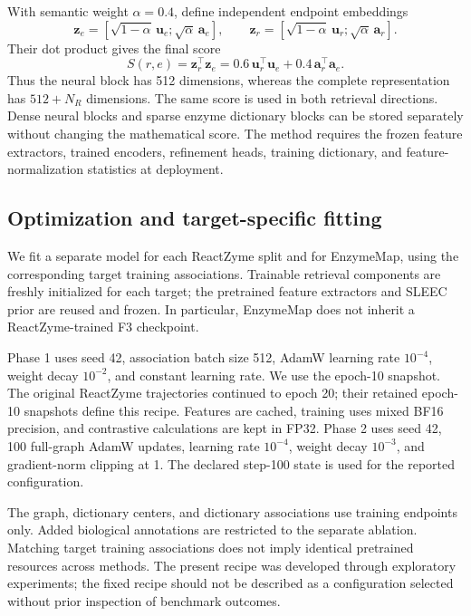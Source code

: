 With semantic weight $\alpha=0.4$, define independent endpoint embeddings
\begin{equation}
  \mathbf{z}_e=[\sqrt{1-\alpha}\,\mathbf{u}_e;\sqrt{\alpha}\,\mathbf{a}_e],\qquad
  \mathbf{z}_r=[\sqrt{1-\alpha}\,\mathbf{u}_r;\sqrt{\alpha}\,\mathbf{a}_r].
  \label{eq:v4-concatenation}
\end{equation}
Their dot product gives the final score
\begin{equation}
  \boxed{S(r,e)=\mathbf{z}_r^\top\mathbf{z}_e
       =0.6\,\mathbf{u}_r^\top \mathbf{u}_e+0.4\,\mathbf{a}_r^\top \mathbf{a}_e.}
  \label{eq:v4-final-score}
\end{equation}
Thus the neural block has 512 dimensions, whereas the complete representation
has $512+N_R$ dimensions. The same score is used in both retrieval directions.
Dense neural blocks and sparse enzyme dictionary blocks can be stored
separately without changing the mathematical score. The method requires the
frozen feature extractors, trained encoders, refinement heads, training
dictionary, and feature-normalization statistics at deployment.

\subsection{Optimization and target-specific fitting}
\label{sec:v4-optimization}
We fit a separate model for each ReactZyme split and for EnzymeMap, using the
corresponding target training associations. Trainable retrieval components
are freshly initialized for each target; the pretrained feature extractors
and SLEEC prior are reused and frozen. In particular, EnzymeMap does not
inherit a ReactZyme-trained F3 checkpoint.

Phase 1 uses seed 42, association batch size 512, AdamW learning rate
$10^{-4}$, weight decay $10^{-2}$, and constant learning rate. We use the
epoch-10 snapshot. The original ReactZyme trajectories continued to epoch 20;
their retained epoch-10 snapshots define this recipe. Features are cached,
training uses mixed BF16 precision, and contrastive calculations are kept in
FP32. Phase 2 uses seed 42, 100 full-graph AdamW updates, learning rate
$10^{-4}$, weight decay $10^{-3}$, and gradient-norm clipping at 1. The
declared step-100 state is used for the reported configuration.

The graph, dictionary centers, and dictionary associations use training
endpoints only. Added biological annotations are restricted to the separate
ablation. Matching target training associations does not imply identical
pretrained resources across methods. The present recipe was developed through exploratory experiments;
the fixed recipe should not be described as a configuration selected without
prior inspection of benchmark outcomes.
